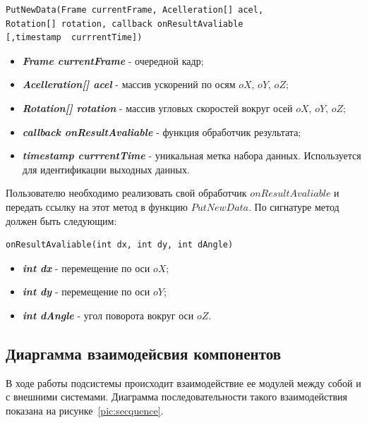 \begin{verbatim}
PutNewData(Frame currentFrame, Acelleration[] acel,
Rotation[] rotation, callback onResultAvaliable 
[,timestamp  currrentTime])
\end{verbatim}
\begin{itemize}
\item \textbf{\textit{Frame currentFrame}} - очередной кадр; 
\item \textbf{\textit{Acelleration[] acel}} - массив ускорений по осям $oX$, $oY$, $o Z$;
\item \textbf{\textit{Rotation[] rotation}} - массив угловых скоростей вокруг осей $oX$, $oY$, $o Z$; 
\item \textbf{\textit{callback onResultAvaliable}} - функция обработчик результата;
\item \textbf{\textit{timestamp  currrentTime}} - уникальная метка набора данных. Используется для идентификации выходных данных. 
\end{itemize}


Пользователю необходимо реализовать свой обработчик $onResultAvaliable$ и передать ссылку на этот метод в функцию $PutNewData$. По сигнатуре метод должен быть следующим:

\begin{verbatim}
onResultAvaliable(int dx, int dy, int dAngle)
\end{verbatim}

\begin{itemize}
\item \textbf{\textit{int dx}} - перемещение по оси $oX$;
\item \textbf{\textit{int dy}} - перемещение по оси $oY$;
\item \textbf{\textit{int dAngle}} - угол поворота вокруг оси $oZ$.
\end{itemize}


\subsection{Диаргамма взаимодейсвия компонентов}
В ходе работы подсистемы происходит взаимодействие ее модулей между собой и с внешними системами. Диаграмма последовательности такого взаимодействия показана на рисунке~\ref{pic:secquence}.

